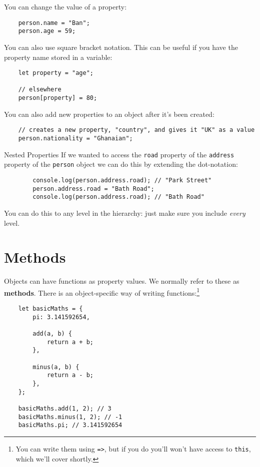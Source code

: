 You can change the value of a property:

\begin{verbatim}
    person.name = "Ban";
    person.age = 59;
\end{verbatim}

You can also use square bracket notation. This can be useful if you have the property name stored in a variable:

\begin{verbatim}
    let property = "age";

    // elsewhere
    person[property] = 80;
\end{verbatim}

You can also add new properties to an object after it's been created:

\begin{verbatim}
    // creates a new property, "country", and gives it "UK" as a value
    person.nationality = "Ghanaian";
\end{verbatim}

\begin{infobox}{Nested Properties}
    If we wanted to access the \texttt{road} property of the \texttt{address} property of the \texttt{person} object we can do this by extending the dot-notation:

    \begin{verbatim}
        console.log(person.address.road); // "Park Street"
        person.address.road = "Bath Road";
        console.log(person.address.road); // "Bath Road"
    \end{verbatim}

    You can do this to any level in the hierarchy: just make sure you include \textit{every} level.
\end{infobox}


\section{Methods}

Objects can have functions as property values. We normally refer to these as \textbf{methods}. There is an object-specific way of writing functions:\footnote{You can write them using \texttt{=>}, but if you do you'll won't have access to \texttt{this}, which we'll cover shortly.}

\begin{verbatim}
    let basicMaths = {
        pi: 3.141592654,

        add(a, b) {
            return a + b;
        },

        minus(a, b) {
            return a - b;
        },
    };

    basicMaths.add(1, 2); // 3
    basicMaths.minus(1, 2); // -1
    basicMaths.pi; // 3.141592654
\end{verbatim}

